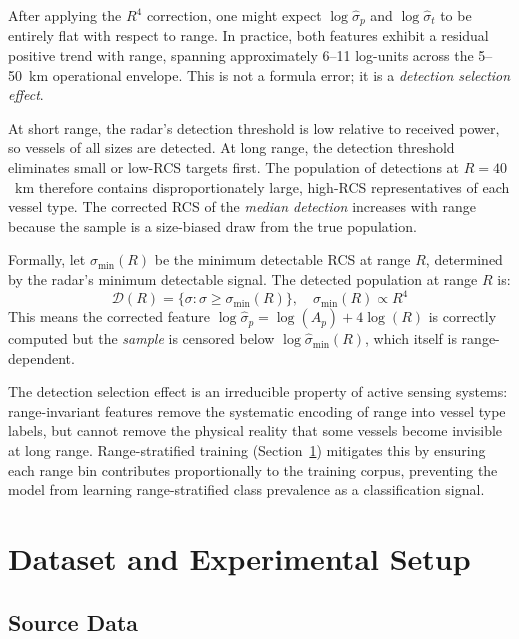 \documentclass[journal]{IEEEtran}
\begin{document}
After applying the $R^4$ correction, one might expect $\log\hat{\sigma}_p$
and $\log\hat{\sigma}_t$ to be entirely flat with respect to range. In
practice, both features exhibit a residual positive trend with range,
spanning approximately 6--11 log-units across the 5--50~km operational
envelope. This is not a formula error; it is a \emph{detection
selection effect}.

At short range, the radar's detection threshold is low relative to
received power, so vessels of all sizes are detected. At long range,
the detection threshold eliminates small or low-RCS targets first. The
population of detections at $R = 40$~km therefore contains
disproportionately large, high-RCS representatives of each vessel type.
The corrected RCS of the \emph{median detection} increases with range
because the sample is a size-biased draw from the true population.

Formally, let $\sigma_{\min}(R)$ be the minimum detectable RCS at
range $R$, determined by the radar's minimum detectable signal. The
detected population at range $R$ is:
\begin{equation}
  \mathcal{D}(R) = \{ \sigma : \sigma \geq \sigma_{\min}(R) \},
  \quad \sigma_{\min}(R) \propto R^4
  \label{eq:detection_floor}
\end{equation}
This means the corrected feature $\log\hat{\sigma}_p = \log(A_p) + 4\log(R)$
is correctly computed but the \emph{sample} is censored below
$\log\hat{\sigma}_{\min}(R)$, which itself is range-dependent.

The detection selection effect is an irreducible property of active
sensing systems: range-invariant features remove the systematic
encoding of range into vessel type labels, but cannot remove the
physical reality that some vessels become invisible at long range.
Range-stratified training (Section~\ref{sec:data}) mitigates this by
ensuring each range bin contributes proportionally to the training
corpus, preventing the model from learning range-stratified class
prevalence as a classification signal.

\section{Dataset and Experimental Setup}
\label{sec:data}

\subsection{Source Data}
\end{document}
